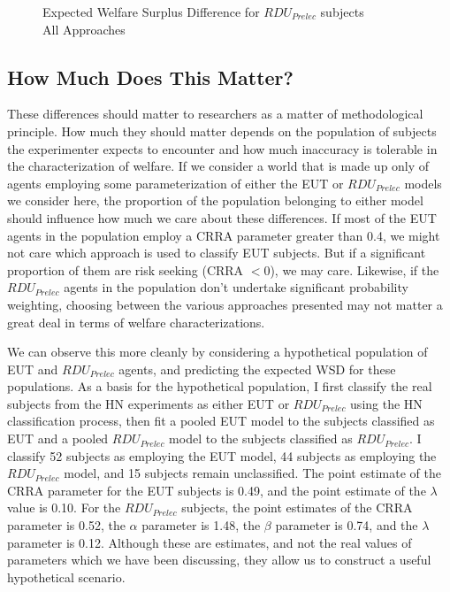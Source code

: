 \documentclass[../main.tex]{subfiles}
\begin{document}
\begin{figure}[h!]
	\center
	\caption{Expected Welfare Surplus Difference for $\mathit{RDU_{Prelec}}$ subjects\\All Approaches}
	\label{fig:exwel-pre}
\end{figure}

\subsection{How Much Does This Matter?}

These differences should matter to researchers as a matter of methodological principle.
How much they should matter depends on the population of subjects the experimenter expects to encounter and how much inaccuracy is tolerable in the characterization of welfare.
If we consider a world that is made up only of agents employing some parameterization of either the EUT or $\mathit{RDU_{Prelec}}$ models we consider here, the proportion of the population belonging to either model should influence how much we care about these differences.
If most of the EUT agents in the population employ a CRRA parameter greater than 0.4, we might not care which approach is used to classify EUT subjects.
But if a significant proportion of them are risk seeking (CRRA $< 0$), we may care.
Likewise, if the $\mathit{RDU_{Prelec}}$ agents in the population don't undertake significant probability weighting, choosing between the various approaches presented may not matter a great deal in terms of welfare characterizations.

We can observe this more cleanly by considering a hypothetical population of EUT and $\mathit{RDU_{Prelec}}$ agents, and predicting the expected WSD for these populations.
As a basis for the hypothetical population, I first classify the real subjects from the HN experiments as either EUT or $\mathit{RDU_{Prelec}}$ using the HN classification process, then fit a pooled EUT model to the subjects classified as EUT and a pooled $\mathit{RDU_{Prelec}}$ model to the subjects classified as $\mathit{RDU_{Prelec}}$.
I classify 52 subjects as employing the EUT model, 44 subjects as employing the $\mathit{RDU_{Prelec}}$ model, and 15 subjects remain unclassified.
The point estimate of the CRRA parameter for the EUT subjects is 0.49, and the point estimate of the $\lambda$ value is 0.10.
For the $\mathit{RDU_{Prelec}}$ subjects, the point estimates of the CRRA parameter is 0.52, the $\alpha$ parameter is 1.48, the $\beta$ parameter is 0.74, and the $\lambda$ parameter is 0.12.
Although these are estimates, and not the real values of parameters which we have been discussing, they allow us to construct a useful hypothetical scenario.
\end{document}
